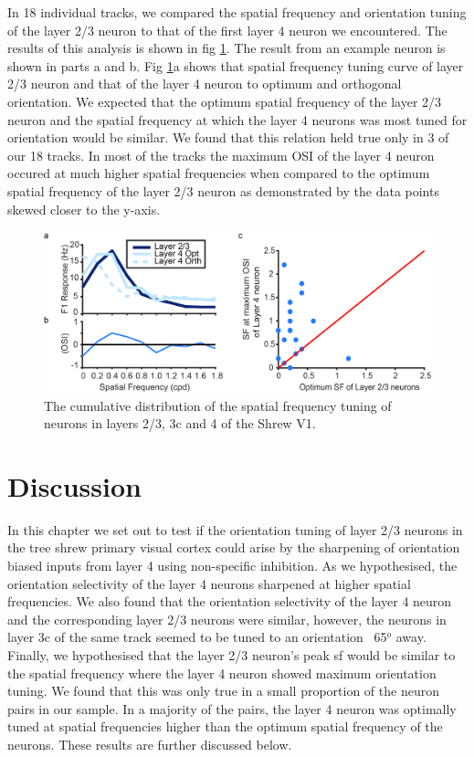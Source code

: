 In 18 individual tracks, we compared the spatial frequency and orientation tuning of the layer 2/3 neuron to that of the first layer 4 neuron we encountered. The results of this analysis is shown in fig \ref{fig:sfsum}. The result from an example neuron is shown in parts a and b. Fig \ref{fig:sfsum}a shows that spatial frequency tuning curve of layer 2/3 neuron and that of the layer 4 neuron to optimum and orthogonal orientation. We expected that the optimum spatial frequency of the layer 2/3 neuron and the spatial frequency at which the layer 4 neurons was most tuned for orientation would be similar. We found that this relation held true only in 3 of our 18 tracks. In most of the tracks the maximum OSI of the layer 4 neuron occured at much higher spatial frequencies when compared to the optimum spatial frequency of the layer 2/3 neuron as demonstrated by the data points skewed closer to the y-axis.
	\begin{figure}[H]
	
		\includegraphics[width=\linewidth]{ShrewV1/sfsummary.jpg}
		\caption{The cumulative distribution of the spatial frequency tuning of neurons in layers 2/3, 3c and 4 of the Shrew V1.}
		\label{fig:sfsum}
	\end{figure}

\section{Discussion}

In this chapter we set out to test if the orientation tuning of layer 2/3 neurons in the tree shrew primary visual cortex could arise by the sharpening of orientation biased inputs from layer 4 using non-specific inhibition. As we hypothesised, the orientation selectivity of the layer 4 neurons sharpened at higher spatial frequencies. We also found that the orientation selectivity of the layer 4 neuron and the corresponding layer 2/3 neurons were similar, however, the neurons in layer 3c of the same track seemed to be tuned to an orientation ~65$^o$ away. Finally, we hypothesised that the layer 2/3 neuron's peak sf would be similar to the spatial frequency where the layer 4 neuron showed maximum orientation tuning. We found that this was only true in a small proportion of the neuron pairs in our sample. In a majority of the pairs, the layer 4 neuron was optimally tuned at spatial frequencies higher than the optimum spatial frequency of the neurons. These results are further discussed below.


